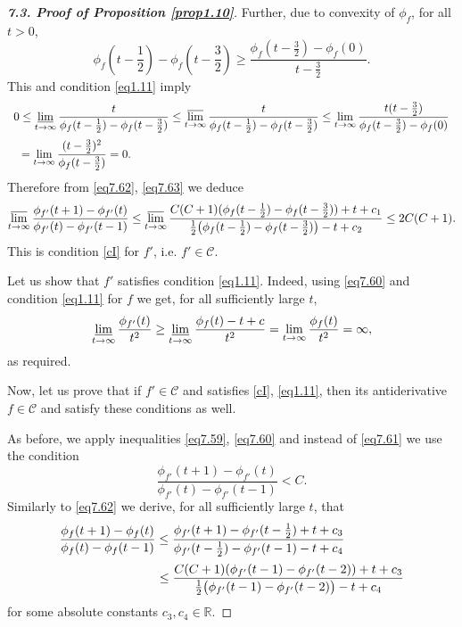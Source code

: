 \documentclass[11pt, oneside]{amsart}
\begin{document}
\begin{proof}[{\bf 7.3. Proof of Proposition \ref{prop1.10}}]
Further, due to convexity of $\phi_f$, for all $t>0$,
\[
\phi_f(t-\mbox{$\frac 12$})-\phi_f(t-\mbox{$\frac 32$})\ge\frac{\phi_f(t-\frac 32)-\phi_f(0)}{t-\frac 32}.
\]
This and condition \eqref{eq1.11} imply\smallskip
\begin{equation}\label{eq7.63}
\begin{array}{l}
\displaystyle
0\le\varliminf_{t\rightarrow\infty}\frac{t}{\phi_f(t-\frac 12)-\phi_f(t-\frac 32)}\le
\varlimsup_{t\rightarrow\infty}\frac{t}{\phi_f(t-\frac 12)-\phi_f(t-\frac 32)}\le \lim_{t\rightarrow\infty}\frac{t (t-\frac 32)}{\phi_f(t-\frac 32)-\phi_f(0)}\medskip\\
\displaystyle \ \ =\lim_{t\rightarrow\infty}\frac{(t-\frac 32)^2}{\phi_f(t-\frac 32)}=0.
\end{array}
\end{equation}
Therefore from \eqref{eq7.62}, \eqref{eq7.63} we deduce
\[
\varlimsup_{t\rightarrow\infty}\frac{\phi_{f'}(t+1)-\phi_{f'}(t)}{\phi_{f'}(t)-\phi_{f'}(t-1)}
\le\varlimsup_{t\rightarrow\infty}\frac{C(C+1)(\phi_f(t-\frac 12)-\phi_f(t-\frac 32))+t+ c_1}{
\frac{1}{2}\bigl(\phi_f(t-\frac 12)-\phi_f(t-\frac 32)\bigr)-t+c_2}\le 2C(C+1).
\]
This is condition \eqref{cI} for $f'$, i.e. $f'\in\mathscr C$.

Let us show that $f'$ satisfies condition \eqref{eq1.11}. Indeed, using \eqref{eq7.60} and condition \eqref{eq1.11} for $f$ we get, for all sufficiently large $t$,
\[
\varliminf_{t\rightarrow\infty}\frac{\phi_{f'}(t)}{t^2}\ge \varliminf_{t\rightarrow\infty} \frac{\phi_f(t)-t+c}{t^2}=\lim_{t\rightarrow\infty}\frac{\phi_f(t)}{t^2}=\infty,
\]
as required.

Now, let us prove that if $f'\in\mathscr C$ and satisfies \eqref{cI}, \eqref{eq1.11}, then its antiderivative $f\in\mathscr C$ and satisfy these conditions as well.

As before, we apply inequalities \eqref{eq7.59}, \eqref{eq7.60} and instead of \eqref{eq7.61} we use the condition
\begin{equation}\label{eq7.64}
\frac{\phi_{f'}(t+1)-\phi_{f'}(t)}{\phi_{f'}(t)-\phi_{f'}(t-1)}<C.
\end{equation}
Similarly to \eqref{eq7.62} we derive, for all sufficiently large $t$, that
\begin{equation}\label{eq7.65}
\begin{array}{l}
\displaystyle
\frac{\phi_{f}(t+1)-\phi_{f}(t)}{\phi_{f}(t)-\phi_{f}(t-1)}\le \frac{\phi_{f'}(t+1)-\phi_{f'}(t-\frac 12)+t+c_3}{\phi_{f'}(t-\frac 12)-\phi_{f'}(t-1)-t+c_4}\medskip\\
\displaystyle \qquad\qquad\qquad\qquad\le \frac{C(C+1)(\phi_{f'}(t-1)-\phi_{f'}(t-2))+t+ c_3}{
\frac{1}{2}\bigl(\phi_{f'}(t-1)-\phi_{f'}(t-2)\bigr)-t+c_4}
\end{array}
\end{equation}
for some absolute constants $c_3,c_4\in\mathbb R$. 


\end{proof}
\end{document}
